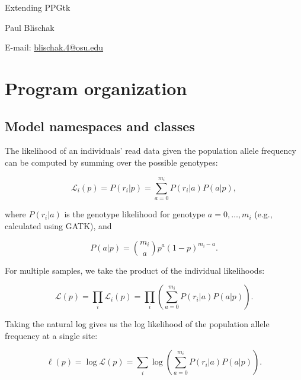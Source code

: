 \documentclass[11pt,english,letterpaper,oneside]{article}
\begin{document}
\pagestyle{empty}


	{\huge Extending PPGtk}
	\vspace{0.2in}

	Paul Blischak

	E-mail: \href{mailto:blischak.4@osu.edu}{blischak.4@osu.edu}
	\vspace{0.2in}

\tableofcontents

\newpage

\clearpage
\pagestyle{plain}
\setcounter{page}{1}



\section{Program organization}


\subsection{Model namespaces and classes}

The likelihood of an individuals' read data given the population allele frequency can be computed by summing over the possible genotypes:

\begin{equation}
\mathcal{L}_i(p) = P(r_i|p) = \sum_{a = 0}^{m_i} P(r_i|a)P(a|p),
\end{equation}

where $P(r_i|a)$ is the genotype likelihood for genotype $a = 0,\dots,m_i$ (e.g., calculated using GATK), and

\begin{equation*}
P(a|p) = \binom{m_i}{a}p^a (1-p)^{m_i - a}.
\end{equation*}

For multiple samples, we take the product of the individual likelihoods:

\begin{equation}
\mathcal{L}(p) = \prod_i \mathcal{L}_i(p) = \prod_i \left(\sum_{a = 0}^{m_i} P(r_i|a)P(a|p)\right).
\end{equation}

Taking the natural log gives us the log likelihood of the population allele frequency at a single site:

\begin{equation}
\ell(p) = \log \mathcal{L}(p) = \sum_i \log \left( \sum_{a= 0}^{m_i} P(r_i|a)P(a|p)\right).
\end{equation}
\end{document}
